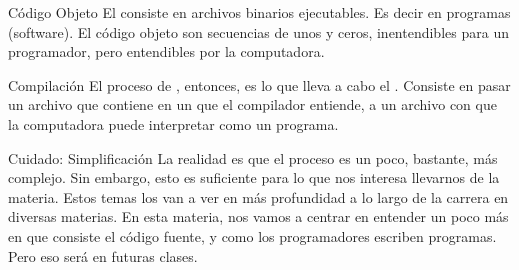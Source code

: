 
\begin{frame}{Código Objeto}
  El  consiste en archivos binarios ejecutables. Es
  decir en programas (software).
  \jump
  El código objeto son secuencias de unos y ceros, inentendibles para un
  programador, pero entendibles por la computadora.
\end{frame}


\begin{frame}{Compilación}
  El proceso de , entonces, es lo que lleva a cabo el
  . Consiste en pasar un archivo que contiene
   en un  que el compilador entiende,
  a un archivo con  que la computadora puede interpretar
  como un programa.
  \jump
\end{frame}


\begin{frame}{Cuidado: Simplificación}
  La realidad es que el proceso es un poco, bastante, más complejo. Sin embargo,
  esto es suficiente para lo que nos interesa llevarnos de la materia. Estos
  temas los van a ver en más profundidad a lo largo de la carrera en diversas
  materias.
  \jump
  En esta materia, nos vamos a centrar en entender un poco más en que consiste
  el código fuente, y como los programadores escriben programas. Pero eso será
  en futuras clases.
\end{frame}